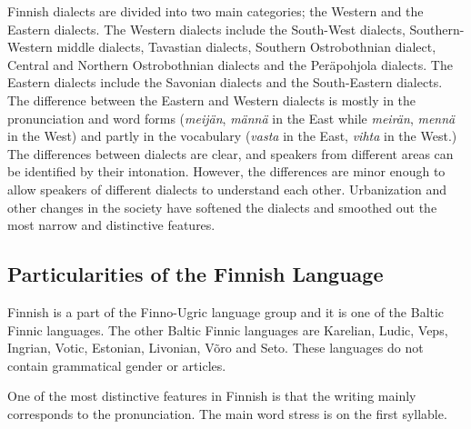 \documentclass[]{../../metanetpaper}
\begin{document}
\begin{multicols}{2}
Finnish dialects are divided into two main categories; the Western and the
Eastern dialects. The Western dialects include the South-West dialects,
Southern-Western middle dialects, Tavastian dialects, Southern Ostrobothnian
dialect, Central and Northern Ostrobothnian dialects and the Peräpohjola
dialects. The Eastern dialects include the Savonian dialects and the
South-Eastern dialects. The difference between the Eastern and Western dialects
is mostly in the pronunciation and word forms
 (\textit{\foreignlanguage{finnish}{\textit{meijän}}},
  \textit{\foreignlanguage{finnish}{\textit{männä}}} in the East while
  \textit{\foreignlanguage{finnish}{\textit{meirän}}},
  \textit{\foreignlanguage{finnish}{\textit{mennä}}} in the West)
and partly in the vocabulary
 (\textit{\foreignlanguage{finnish}{\textit{vasta}}} in the East,
  \textit{\foreignlanguage{finnish}{\textit{vihta}}} in the West.)
The differences between dialects are clear, and speakers
from different areas can be identified by their intonation. However, the
differences are minor enough to allow speakers of different dialects to
understand each other. Urbanization and other changes in the society have
softened the dialects and smoothed out the most narrow and distinctive
features.

\subsection{Particularities of the Finnish Language}

Finnish is a part of the Finno-Ugric language group and it is one of the Baltic
Finnic languages. The other Baltic Finnic languages are Karelian, Ludic, Veps,
Ingrian, Votic, Estonian, Livonian, Võro and Seto. These languages do not
contain grammatical gender or articles.

One of the most distinctive features in Finnish is that the writing mainly
corresponds to the pronunciation. The main word stress is on the first
syllable.



\end{multicols}
\end{document}
